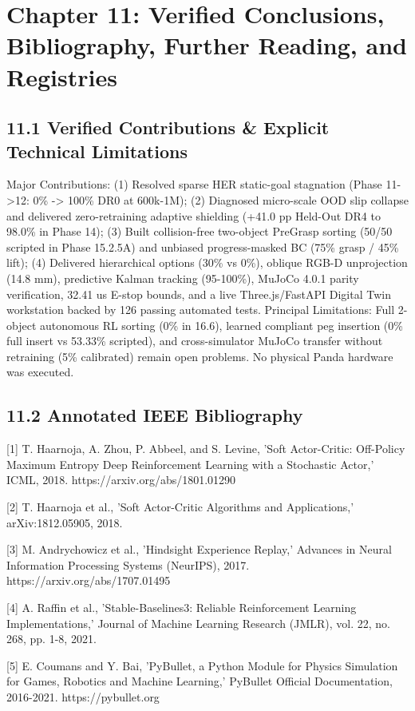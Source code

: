\chapter{Chapter 11: Verified Conclusions, Bibliography, Further Reading, and Registries}
\section{11.1 Verified Contributions \& Explicit Technical Limitations}
Major Contributions: (1) Resolved sparse HER static-goal stagnation (Phase 11->12: 0\% -> 100\% DR0 at 600k-1M); (2) Diagnosed micro-scale OOD slip collapse and delivered zero-retraining adaptive shielding (+41.0 pp Held-Out DR4 to 98.0\% in Phase 14); (3) Built collision-free two-object PreGrasp sorting (50/50 scripted in Phase 15.2.5A) and unbiased progress-masked BC (75\% grasp / 45\% lift); (4) Delivered hierarchical options (30\% vs 0\%), oblique RGB-D unprojection (14.8 mm), predictive Kalman tracking (95-100\%), MuJoCo 4.0.1 parity verification, 32.41 us E-stop bounds, and a live Three.js/FastAPI Digital Twin workstation backed by 126 passing automated tests.
Principal Limitations: Full 2-object autonomous RL sorting (0\% in 16.6), learned compliant peg insertion (0\% full insert vs 53.33\% scripted), and cross-simulator MuJoCo transfer without retraining (5\% calibrated) remain open problems. No physical Panda hardware was executed.

\section{11.2 Annotated IEEE Bibliography}
[1] T. Haarnoja, A. Zhou, P. Abbeel, and S. Levine, 'Soft Actor-Critic: Off-Policy Maximum Entropy Deep Reinforcement Learning with a Stochastic Actor,' ICML, 2018. https://arxiv.org/abs/1801.01290

[2] T. Haarnoja et al., 'Soft Actor-Critic Algorithms and Applications,' arXiv:1812.05905, 2018.

[3] M. Andrychowicz et al., 'Hindsight Experience Replay,' Advances in Neural Information Processing Systems (NeurIPS), 2017. https://arxiv.org/abs/1707.01495

[4] A. Raffin et al., 'Stable-Baselines3: Reliable Reinforcement Learning Implementations,' Journal of Machine Learning Research (JMLR), vol. 22, no. 268, pp. 1-8, 2021.

[5] E. Coumans and Y. Bai, 'PyBullet, a Python Module for Physics Simulation for Games, Robotics and Machine Learning,' PyBullet Official Documentation, 2016-2021. https://pybullet.org

